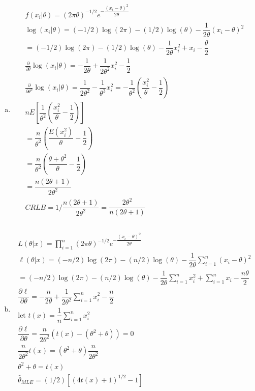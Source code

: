 \documentclass{article}
\newcommand{\pderiv}[2]{\frac{\partial #1}{\partial #2} }
\newcommand{\sumn}{\sum_{i=1}^{n}}
\newcommand{\prodn}{\prod_{i=1}^{n}}
\newcommand{\dll}[1]{\dfrac{\partial\ell}{\partial{#1}}}
\newcommand{\mle}{\hat{\theta}_{MLE}}
\newcommand{\sumx}{\sum_{i=1}^{n}x_i}
\begin{document}
\begin{flushleft}
\begin{enumerate}[(a)]
	\item 
\begin{multline*}\\
f(x_i|\theta)=(2\pi\theta)^{-1/2}e^{-\dfrac{(x_i-\theta)^2}{2\theta}}\\
\log(x_i|\theta)=(-1/2)\log(2\pi)-(1/2)\log(\theta)-\dfrac{1}{2\theta}\left( x_i-\theta\right)^2\\
=(-1/2)\log(2\pi)-(1/2)\log(\theta)-\dfrac{1}{2\theta} x_i^2+x_i-\dfrac{\theta}{2}\\
\pderiv{}{\theta}\log(x_i|\theta)=-\dfrac{1}{2\theta}+\dfrac{1}{2\theta^2} x_i^2-\dfrac{1}{2}\\
\pderiv{}{\theta^2}\log(x_i|\theta)=\dfrac{1}{2\theta^2}-\dfrac{1}{\theta^3} x_i^2=-\dfrac{1}{\theta^2}\left(\dfrac{x_i^2}{\theta}-\dfrac{1}{2}\right)\\
nE\left[\dfrac{1}{\theta^2}\left(\dfrac{x_i^2}{\theta}-\dfrac{1}{2}\right)\right]\\
=\dfrac{n}{\theta^2}\left(\dfrac{E(x_i^2)}{\theta}-\dfrac{1}{2}\right)\\
=\dfrac{n}{\theta^2}\left(\dfrac{\theta+\theta^2}{\theta}-\dfrac{1}{2}\right)\\
=\dfrac{n(2\theta+1)}{2\theta^2}\\
CRLB=1/\dfrac{n(2\theta+1)}{2\theta^2}=\dfrac{2\theta^2}{n(2\theta+1)}\\
\end{multline*}
\pagebreak
	\item 
\begin{multline*}\\
L(\theta|x)=\prodn(2\pi\theta)^{-1/2}e^{-\dfrac{(x_i-\theta)^2}{2\theta}}\\
\ell(\theta|x)=(-n/2)\log(2\pi)-(n/2)\log(\theta)-\dfrac{1}{2\theta}\sumn\left( x_i-\theta\right)^2\\
=(-n/2)\log(2\pi)-(n/2)\log(\theta)-\dfrac{1}{2\theta}\sumn x_i^2+\sumx-\dfrac{n\theta}{2}\\
\dll{\theta}=-\dfrac{n}{2\theta}+\dfrac{1}{2\theta^2} \sumn x_i^2-\dfrac{n}{2}\\
\text{let } t(x)=\dfrac{1}{n}\sumn x_i^2\\
\dll{\theta}=\dfrac{n}{2\theta^2}\left(t(x)-(\theta^2+\theta)\right)=0\\
\dfrac{n}{2\theta^2}t(x)=(\theta^2+\theta)\dfrac{n}{2\theta^2}\\
\theta^2+\theta=t(x)\\
\mle=(1/2)[(4t(x)+1)^{1/2}-1]\\
\end{multline*}

\end{enumerate}
\end{flushleft}
\end{document}
